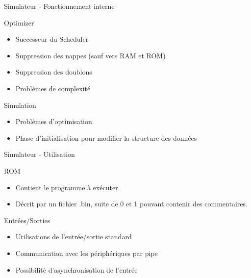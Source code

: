 \documentclass[handout]{beamer}
\begin{document}
\begin{frame}{Simulateur - Fonctionnement interne}
  
  \begin{block}{Optimizer}
    \begin{itemize}
    \item Successeur du Scheduler
    \item Suppression des nappes (sauf vers RAM et ROM)
    \item Suppression des doublons
    \item Problèmes de complexité
    \end{itemize}
  \end{block}
  
  \pause
  
  \begin{block}{Simulation}
    \begin{itemize}
    \item Problèmes d'optimisation
    \item Phase d'initialisation pour modifier la structure des données
    \end{itemize}
  \end{block}
  
\end{frame}

\begin{frame}{Simulateur - Utilisation}

  \begin{block}{ROM}
    \begin{itemize}
    \item Contient le programme à exécuter.
    \item Décrit par un fichier .bin, suite de 0 et 1 pouvant contenir des commentaires.
    \end{itemize}
  \end{block}
	
  \pause
	
  \begin{block}{Entrées/Sorties}
    \begin{itemize}
    \item Utilisations de l'entrée/sortie standard
    \item Communication avec les périphériques par pipe
    \item Possibilité d'asynchronisation de l'entrée
    \end{itemize}
  \end{block}

\end{frame}
\end{document}
